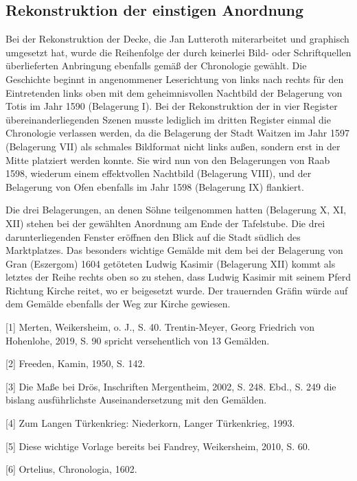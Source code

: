 \documentclass[
  letterpaper,
]{book}
\begin{document}
\subsection{Rekonstruktion der einstigen
Anordnung}\label{rekonstruktion-der-einstigen-anordnung}

Bei der Rekonstruktion der Decke, die Jan Lutteroth miterarbeitet und
graphisch umgesetzt hat, wurde die Reihenfolge der durch keinerlei Bild-
oder Schriftquellen überlieferten Anbringung ebenfalls gemäß der
Chronologie gewählt. Die Geschichte beginnt in angenommener Leserichtung
von links nach rechts für den Eintretenden links oben mit dem
geheimnisvollen Nachtbild der Belagerung von Totis im Jahr 1590
(Belagerung I). Bei der Rekonstruktion der in vier Register
übereinanderliegenden Szenen musste lediglich im dritten Register einmal
die Chronologie verlassen werden, da die Belagerung der Stadt Waitzen im
Jahr 1597 (Belagerung VII) als schmales Bildformat nicht links außen,
sondern erst in der Mitte platziert werden konnte. Sie wird nun von den
Belagerungen von Raab 1598, wiederum einem effektvollen Nachtbild
(Belagerung VIII), und der Belagerung von Ofen ebenfalls im Jahr 1598
(Belagerung IX) flankiert.

Die drei Belagerungen, an denen Söhne teilgenommen hatten (Belagerung X,
XI, XII) stehen bei der gewählten Anordnung am Ende der Tafelstube. Die
drei darunterliegenden Fenster eröffnen den Blick auf die Stadt südlich
des Marktplatzes. Das besonders wichtige Gemälde mit dem bei der
Belagerung von Gran (Eszergom) 1604 getöteten Ludwig Kasimir (Belagerung
XII) kommt als letztes der Reihe rechts oben so zu stehen, dass Ludwig
Kasimir mit seinem Pferd Richtung Kirche reitet, wo er beigesetzt wurde.
Der trauernden Gräfin würde auf dem Gemälde ebenfalls der Weg zur Kirche
gewiesen.

{[}1{]} Merten, Weikersheim, o. J., S. 40. Trentin-Meyer, Georg
Friedrich von Hohenlohe, 2019, S. 90 spricht versehentlich von 13
Gemälden.

{[}2{]} Freeden, Kamin, 1950, S. 142.

{[}3{]} Die Maße bei Drös, Inschriften Mergentheim, 2002, S. 248. Ebd.,
S. 249 die bislang ausführlichste Auseinandersetzung mit den Gemälden.

{[}4{]} Zum Langen Türkenkrieg: Niederkorn, Langer Türkenkrieg, 1993.

{[}5{]} Diese wichtige Vorlage bereits bei Fandrey, Weikersheim, 2010,
S. 60.

{[}6{]} Ortelius, Chronologia, 1602.
\end{document}

